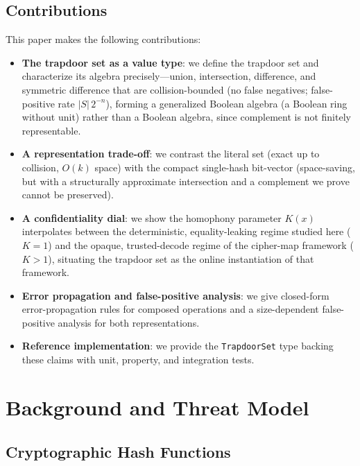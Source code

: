 \documentclass[10pt,conference]{IEEEtran}
\begin{document}
\subsection{Contributions}

This paper makes the following contributions:

\begin{itemize}
\item \textbf{The trapdoor set as a value type}: we define the trapdoor set and characterize its algebra precisely---union, intersection, difference, and symmetric difference that are collision-bounded (no false negatives; false-positive rate $|S|\,2^{-n}$), forming a generalized Boolean algebra (a Boolean ring without unit) rather than a Boolean algebra, since complement is not finitely representable.

\item \textbf{A representation trade-off}: we contrast the literal set (exact up to collision, $O(k)$ space) with the compact single-hash bit-vector (space-saving, but with a structurally approximate intersection and a complement we prove cannot be preserved).

\item \textbf{A confidentiality dial}: we show the homophony parameter $K(x)$ interpolates between the deterministic, equality-leaking regime studied here ($K=1$) and the opaque, trusted-decode regime of the cipher-map framework ($K>1$), situating the trapdoor set as the online instantiation of that framework.

\item \textbf{Error propagation and false-positive analysis}: we give closed-form error-propagation rules for composed operations and a size-dependent false-positive analysis for both representations.

\item \textbf{Reference implementation}: we provide the \texttt{TrapdoorSet} type backing these claims with unit, property, and integration tests.
\end{itemize}

\section{Background and Threat Model}
\label{sec:background}

\subsection{Cryptographic Hash Functions}
\end{document}

